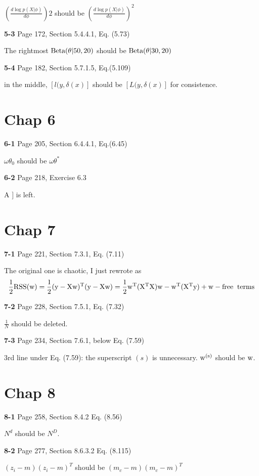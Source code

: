 \documentclass[aps,preprint,a4]{revtex4-1}
\newcommand{\nl}{\nonumber \\}
\begin{document}
$\left(\frac{d\log p(X|\phi)}{d\phi}\right)2$ should be
$\left(\frac{d\log p(X|\phi)}{d\phi}\right)^{2}$ 

{\color{red}\textbf{5-3}} Page 172, Section 5.4.4.1, Eq. (5.73)

The rightmost $\rm Beta(\theta|50,20)$ should be
$\rm Beta(\theta|30,20)$

{\color{red}\textbf{5-4}} Page 182, Section 5.7.1.5, Eq.(5.109)

in the middle, $[l(y,\delta(x)]$ should be $[L(y,\delta(x)]$ for consistence.


\section{Chap 6}
{\color{red}\textbf{6-1}} Page 205, Section 6.4.4.1, Eq.(6.45)

$\omega\theta_{0}$ should be $\omega\theta^{*}$

{\color{red}\textbf{6-2}} Page 218, Exercise 6.3

A $]$ is left.


\section{Chap 7}
{\color{red}\textbf{7-1}} Page 221, Section 7.3.1, Eq. (7.11)

The original one is chaotic, I just rewrote as
\begin{equation}
\frac{1}{2} \rm RSS(w) = \frac{1}{2}(y-Xw)^{T}(y-Xw) = \frac{1}{2}w^{T}(X^{T}X)w
-w^{T}(X^{T}y) + \rm{w-free \;\; terms}\nl
\end{equation}

{\color{red}\textbf{7-2}} Page 228, Section 7.5.1, Eq. (7.32)

$\frac{1}{N}$ should be deleted.

{\color{red}\textbf{7-3}} Page 234, Section 7.6.1, below Eq. (7.59)

3rd line under Eq. (7.59): the superscript $(s)$ is unnecessary. $\rm w^{(s)}$ should
be $\rm w$.


\section{Chap 8}
{\color{red}\textbf{8-1}} Page 258, Section 8.4.2 Eq. (8.56)

$N^{d}$ should be $N^{D}$.

{\color{red}\textbf{8-2}} Page 277, Section 8.6.3.2 Eq. (8.115)

$(z_{i}-m)(z_{i}-m)^{T}$ should be $(m_{c}-m)(m_{c}-m)^{T}$
\end{document}
